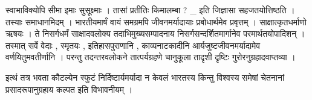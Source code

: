 स्वाभाविक्योपि सीमा इमाः सुसूक्ष्माः । तासां प्रतीतिः किमालम्बा ? _ इति जिज्ञासा सहजतयोत्तिष्ठति । तस्याः समाधानमिदम् । भारतीयमार्षं वायं समग्रमपि जीवनमर्यादायाः प्रबोधार्थमेव प्रवृत्तम् । साक्षात्कृतधर्माणो ऋषयः । ते निसर्गधर्मं साक्षादवलोक्य तदाभिमुख्यसम्पादनाय निसर्गसन्दर्शितमार्गानेव परमार्थतयोपादिशन् । तस्मात् सर्वे वेदाः , स्मृतयः , इतिहासपुराणानि , काव्यनाटकादीनि आर्यजुष्टजीवनमर्यादामेव वर्णयितुमवतीर्णानि । परन्तु तदन्तरवलोकने तात्पर्यग्रहणे चानुकूला तादृशी दृष्टिः गुरोरनुग्रहादवाप्तव्या । 

इत्थं तत्र भवता कौटल्येन स्फुटं निर्दिष्टार्यमर्यादा न केवलं भारतस्य किन्तु विश्वस्य समेषां चेतनानां प्रसादरूपानुग्रहाय कल्पत इति विभावनीयम् ।
